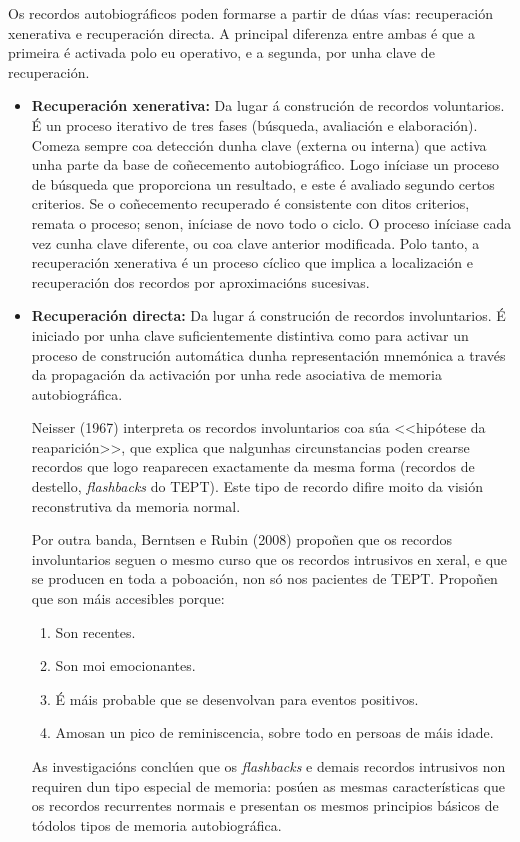 \documentclass[a4paper,11pt]{article}
\begin{document}
Os recordos autobiográficos poden formarse a partir de dúas vías: recuperación xenerativa e recuperación directa. A principal diferenza entre ambas é que a primeira é activada polo eu operativo, e a segunda, por unha clave de recuperación.
\begin{itemize}
	\item \textbf{Recuperación xenerativa:} Da lugar á construción de recordos voluntarios. É un 
	proceso iterativo de tres fases (búsqueda, avaliación e elaboración). Comeza sempre coa 
	detección dunha clave (externa ou interna) que activa unha parte da base de coñecemento 
	autobiográfico. Logo iníciase un proceso de búsqueda que proporciona un resultado, e este é 
	avaliado segundo certos criterios. Se o coñecemento recuperado é consistente con ditos 
	criterios, remata o proceso; senon, iníciase de novo todo o ciclo. O proceso iníciase cada vez 
	cunha clave diferente, ou coa clave anterior modificada. Polo tanto, a recuperación xenerativa
	é un proceso cíclico que implica a localización e recuperación dos recordos por aproximacións
	sucesivas.
	\item \textbf{Recuperación directa:} Da lugar á construción de recordos involuntarios. É
	iniciado por unha clave suficientemente distintiva como para activar un proceso de construción
	automática dunha representación mnemónica a través da propagación da activación por unha rede
	asociativa de memoria autobiográfica.
	
	Neisser (1967) interpreta os recordos involuntarios coa súa <<hipótese da reaparición>>, que
	explica que nalgunhas circunstancias poden crearse recordos que logo reaparecen exactamente da 
	mesma forma (recordos de destello, \textit{flashbacks} do TEPT). Este tipo de recordo difire 
	moito da visión reconstrutiva da memoria normal.
	
	Por outra banda, Berntsen e Rubin (2008) propoñen que os recordos involuntarios seguen o mesmo 
	curso que os recordos intrusivos en xeral, e que se producen en toda a poboación, non só nos 
	pacientes de TEPT. Propoñen que son máis accesibles porque:
	\begin{enumerate}
		\item Son recentes.
		\item Son moi emocionantes.
		\item É máis probable que se desenvolvan para eventos positivos.
		\item Amosan un pico de reminiscencia, sobre todo en persoas de máis idade.
	\end{enumerate}
	
	As investigacións conclúen que os \textit{flashbacks} e demais recordos intrusivos non requiren 
	dun tipo especial de memoria: posúen as mesmas características que os recordos recurrentes 
	normais e presentan os mesmos principios básicos de tódolos tipos de memoria autobiográfica.
\end{itemize}
\end{document}
